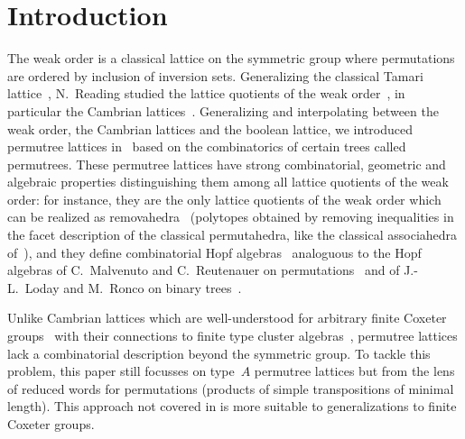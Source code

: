 \section{Introduction}

The weak order is a classical lattice on the symmetric group where permutations are ordered by inclusion of inversion sets.
Generalizing the classical Tamari lattice~\cite{Tamari}, N.~Reading studied the lattice quotients of the weak order~\cite{Reading-latticeCongruences}, in particular the Cambrian lattices~\cite{Reading-cambrianLattices,Reading-coxeterSortable}.
Generalizing and interpolating between the weak order, the Cambrian lattices and the boolean lattice, we introduced permutree lattices in~\cite{PilaudPons-permutrees} based on the combinatorics of certain trees called permutrees.
These permutree lattices have strong combinatorial, geometric and algebraic properties distinguishing them among all lattice quotients of the weak order: for instance, they are the only lattice quotients of the weak order which can be realized as removahedra~\cite{AlbertinPilaudRitter-Removahedra} (\ie polytopes obtained by removing inequalities in the facet description of the classical permutahedra, like the classical associahedra of~\cite{Loday,HohlwegLange}), and they define combinatorial Hopf algebras~\cite{PilaudPons-permutrees} analoguous to the Hopf algebras of C.~Malvenuto and C.~Reutenauer on permutations~\cite{MalvenutoReutenauer} and of J.-L.~Loday and M.~Ronco on binary trees~\cite{LodayRonco}.



Unlike Cambrian lattices which are well-understood for arbitrary finite Coxeter groups~\cite{Reading-cambrianLattices,Reading-coxeterSortable} with their connections to finite type cluster algebras~\cite{FominZelevinsky-ClusterAlgebrasI,FominZelevinsky-ClusterAlgebrasII}, permutree lattices lack a combinatorial description beyond the symmetric group.
To tackle this problem, this paper still focusses on type~$A$ permutree lattices but from the lens of reduced words for permutations (\ie products of simple transpositions of minimal length).
This approach not covered in \cite{PilaudPons-permutrees} is more suitable to generalizations to finite Coxeter groups.

